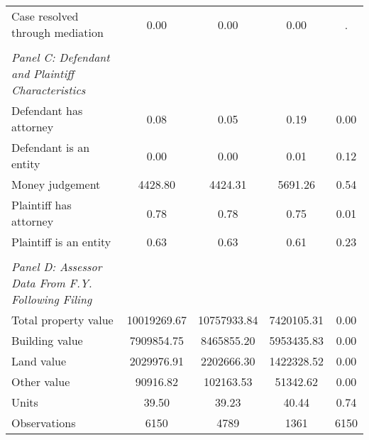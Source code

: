 {\begin{tabular}{l*{4}{c}}
\hspace{0.25cm}Case resolved through mediation&       0.00 &       0.00 &       0.00 &           .\\
\vspace{0.1em} \\ \emph{Panel C: Defendant and Plaintiff Characteristics}&            &            &            &            \\
\hspace{0.25cm}Defendant has attorney&       0.08 &       0.05 &       0.19 &        0.00\\
\hspace{0.25cm}Defendant is an entity&       0.00 &       0.00 &       0.01 &        0.12\\
\hspace{0.25cm}Money judgement&    4428.80 &    4424.31 &    5691.26 &        0.54\\
\hspace{0.25cm}Plaintiff has attorney&       0.78 &       0.78 &       0.75 &        0.01\\
\hspace{0.25cm}Plaintiff is an entity&       0.63 &       0.63 &       0.61 &        0.23\\
\vspace{0.1em} \\ \emph{Panel D: Assessor Data From F.Y. Following Filing}&            &            &            &            \\
\hspace{0.25cm}Total property value&10019269.67 &10757933.84 & 7420105.31 &        0.00\\
\hspace{0.25cm}Building value& 7909854.75 & 8465855.20 & 5953435.83 &        0.00\\
\hspace{0.25cm}Land value& 2029976.91 & 2202666.30 & 1422328.52 &        0.00\\
\hspace{0.25cm}Other value&   90916.82 &  102163.53 &   51342.62 &        0.00\\
\hspace{0.25cm}Units&      39.50 &      39.23 &      40.44 &        0.74\\
\midrule
Observations        &        6150&        4789&        1361&        6150\\
\bottomrule
\end{tabular}
}
